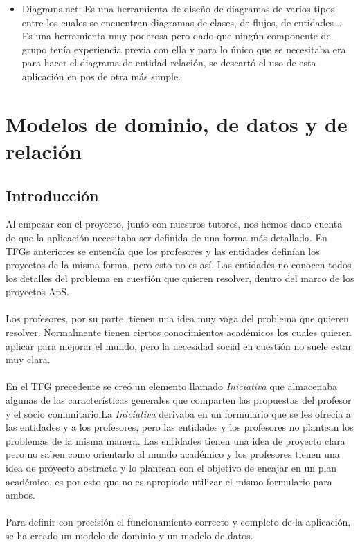 \documentclass[11pt]{book}
\begin{document}
\begin{itemize}
	\item Diagrams.net: Es una herramienta de diseño de diagramas de varios tipos entre los cuales se encuentran diagramas de clases, de flujos, de entidades...
	Es una herramienta muy poderosa pero dado que ningún componente del grupo tenía experiencia previa con ella y para lo único que se necesitaba era para hacer el diagrama de entidad-relación, se descartó el uso de esta aplicación en pos de otra más simple.
\end{itemize}


\chapter{Modelos de dominio, de datos y de relación}\label{cap:modelos}

\section{Introducción}
Al empezar con el proyecto, junto con nuestros tutores, nos hemos dado cuenta de que la aplicación necesitaba ser definida de una forma más detallada. En TFGs anteriores se entendía que los profesores y las entidades definían los proyectos de la misma forma, pero esto no es así. Las entidades no conocen todos los detalles del problema en cuestión que quieren resolver, dentro del marco de los proyectos ApS.\\\\
Los profesores, por su parte, tienen una idea muy vaga del problema que quieren resolver. Normalmente tienen ciertos conocimientos académicos los cuales quieren aplicar para mejorar el mundo, pero la necesidad social en cuestión no suele estar muy clara.\\\\
En el TFG precedente se creó un elemento llamado \emph{Iniciativa} que almacenaba algunas de las características generales que comparten las propuestas del profesor y el socio comunitario.La \emph{Iniciativa} derivaba en un formulario que se les ofrecía a las entidades y a los profesores, pero las entidades y los profesores no plantean los problemas de la misma manera. Las entidades tienen una idea de proyecto clara pero no saben como orientarlo al mundo académico y los profesores tienen una idea de proyecto abstracta y lo plantean con el objetivo de encajar en un plan académico, es por esto que no es apropiado utilizar el mismo formulario para ambos.\\\\
Para definir con precisión el funcionamiento correcto y completo de la aplicación, se ha creado un modelo de dominio y un modelo de datos.
\end{document}
